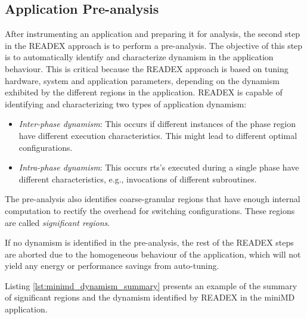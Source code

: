 \subsection{Application Pre-analysis}
\label{sec:dynamism_detection}
After instrumenting an application and preparing it for analysis, the second step in the READEX approach is to perform a pre-analysis. The objective of this step is to automatically identify and characterize dynamism in the application behaviour. This is critical because the READEX approach is based on tuning hardware, system and application parameters, depending on the dynamism exhibited by the different regions in the application. READEX is capable of identifying and characterizing two types of application dynamism:
\begin{itemize}
  \item \textit{Inter-phase dynamism}: This occurs if different instances of the phase region have different execution characteristics. This might lead to different optimal configurations.
  \item \textit{Intra-phase dynamism}: This occurs rts's executed during a single phase have different characteristics, e.g., invocations of different subroutines.
\end{itemize}

The pre-analysis also identifies coarse-granular regions that have enough internal computation to rectify the overhead for switching configurations. These regions are called \textit{significant regions}. 

If no dynamism is identified in the pre-analysis, the rest of the READEX steps are aborted due to the homogeneous behaviour of the application, which will not yield any energy or performance savings from auto-tuning.

Listing \ref{lst:minimd_dynamism_summary} presents an example of the summary of significant regions and the dynamism identified by READEX in the miniMD application.


